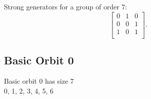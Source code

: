 Strong generators for a group of order 7:
$$
\left[
\begin{array}{*{3}{r}}
0 & 1 & 0\\
0 & 0 & 1\\
1 & 0 & 1\\
\end{array}
\right].
$$
\subsection*{Basic Orbit 0}



Basic orbit 0 has size 7\\
0, 1, 2, 3, 4, 5, 6\\
